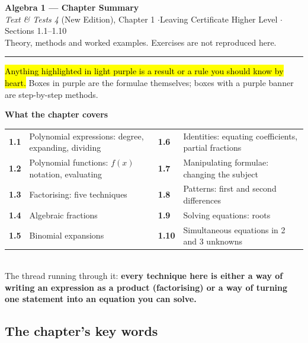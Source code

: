 \documentclass[11pt]{article}
\newcommand{\key}[1]{\hl{#1}}
\newcommand{\keyin}[1]{\textbf{\color{lilacdeep}#1}}  %
\begin{document}
{\color{lilacdeep}\Large\bfseries Algebra 1 --- Chapter Summary}\\[2pt]
{\color{greyish}\small \textit{Text \& Tests 4} (New Edition), Chapter 1 \quad$\cdot$\quad Leaving Certificate Higher Level \quad$\cdot$\quad Sections 1.1--1.10}\\[2pt]
{\color{greyish}\small Theory, methods and worked examples. Exercises are not reproduced here.}\\[-6pt]

\textcolor{lilacline}{\rule{\textwidth}{1pt}}

\key{Anything highlighted in light purple is a result or a rule you should know by heart.}
Boxes in purple are the formulae themselves; boxes with a purple banner are step-by-step methods.

\begin{formulabox}
\textbf{What the chapter covers}\\[3pt]
\begin{tabular}{@{}p{1.35cm}p{6.0cm}p{1.35cm}p{6.4cm}@{}}
\textbf{1.1} & Polynomial expressions: degree, expanding, dividing & \textbf{1.6} & Identities: equating coefficients, partial fractions\\
\textbf{1.2} & Polynomial functions: $f(x)$ notation, evaluating & \textbf{1.7} & Manipulating formulae: changing the subject\\
\textbf{1.3} & Factorising: five techniques & \textbf{1.8} & Patterns: first and second differences\\
\textbf{1.4} & Algebraic fractions & \textbf{1.9} & Solving equations: roots\\
\textbf{1.5} & Binomial expansions & \textbf{1.10} & Simultaneous equations in 2 and 3 unknowns\\
\end{tabular}\\[3pt]
The thread running through it: \keyin{every technique here is either a way of writing an expression as a product (factorising) or a way of turning one statement into an equation you can solve.}
\end{formulabox}

\subsection*{The chapter's key words}
\end{document}
